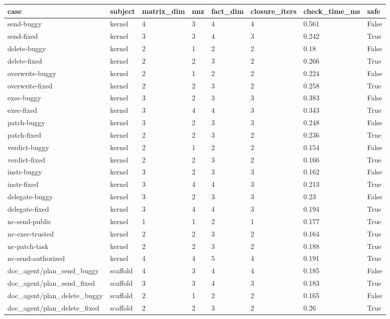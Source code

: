 \begin{table}[t]
\centering
\begin{tabular}{llllllll}
\toprule
case & subject & matrix\_dim & nnz & fact\_dim & closure\_iters & check\_time\_ms & safe \\
\midrule
send-buggy & kernel & 4 & 3 & 4 & 4 & 0.561 & False \\
send-fixed & kernel & 3 & 3 & 4 & 3 & 0.242 & True \\
delete-buggy & kernel & 2 & 1 & 2 & 2 & 0.18 & False \\
delete-fixed & kernel & 2 & 2 & 3 & 2 & 0.266 & True \\
overwrite-buggy & kernel & 2 & 1 & 2 & 2 & 0.224 & False \\
overwrite-fixed & kernel & 2 & 2 & 3 & 2 & 0.258 & True \\
exec-buggy & kernel & 3 & 2 & 3 & 3 & 0.383 & False \\
exec-fixed & kernel & 3 & 4 & 4 & 3 & 0.343 & True \\
patch-buggy & kernel & 3 & 2 & 3 & 3 & 0.248 & False \\
patch-fixed & kernel & 2 & 2 & 3 & 2 & 0.236 & True \\
verdict-buggy & kernel & 2 & 1 & 2 & 2 & 0.154 & False \\
verdict-fixed & kernel & 2 & 2 & 3 & 2 & 0.166 & True \\
instr-buggy & kernel & 3 & 2 & 3 & 3 & 0.162 & False \\
instr-fixed & kernel & 3 & 4 & 4 & 3 & 0.213 & True \\
delegate-buggy & kernel & 3 & 2 & 3 & 3 & 0.23 & False \\
delegate-fixed & kernel & 3 & 4 & 4 & 3 & 0.194 & True \\
nc-send-public & kernel & 1 & 1 & 2 & 1 & 0.177 & True \\
nc-exec-trusted & kernel & 2 & 2 & 3 & 2 & 0.164 & True \\
nc-patch-task & kernel & 2 & 2 & 3 & 2 & 0.188 & True \\
nc-send-authorized & kernel & 4 & 4 & 5 & 4 & 0.191 & True \\
doc\_agent/plan\_send\_buggy & scaffold & 4 & 3 & 4 & 4 & 0.185 & False \\
doc\_agent/plan\_send\_fixed & scaffold & 3 & 3 & 4 & 3 & 0.183 & True \\
doc\_agent/plan\_delete\_buggy & scaffold & 2 & 1 & 2 & 2 & 0.165 & False \\
doc\_agent/plan\_delete\_fixed & scaffold & 2 & 2 & 3 & 2 & 0.26 & True \\

\end{tabular}
\end{table}
